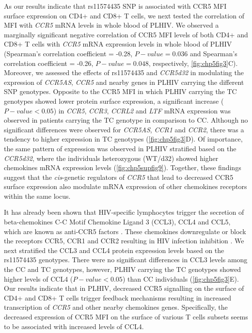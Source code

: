 \documentclass{book}
\begin{document}
\begin{refsection}
As our results indicate that rs11574435 SNP is associated with CCR5 MFI surface expression on CD4+ and CD8+ T cells, we next tested the correlation of MFI with \textit{CCR5} mRNA levels in whole blood of PLHIV.
We observed a marginally significant negative correlation of CCR5 MFI levels of both CD4+ and CD8+ T cells with \textit{CCR5} mRNA expression levels in whole blood of PLHIV (Spearman's correlation coefficient = -0.28, $P-value = 0.036$ and Spearman's correlation coefficient = -0.26, $P-value = 0.048$, respectively, \ref{fig:chp5fig3}C).
Moreover, we assessed the effects of rs11574435 and \textit{CCR5d32} in modulating the expression of \textit{CCR5AS}, \textit{CCR5} and nearby genes in PLHIV carrying the different SNP genotypes.
Opposite to the CCR5 MFI in which PLHIV carrying the TC genotypes showed lower protein surface expression, a significant increase ($P-value < 0.05$) in \textit{CCR5}, \textit{CCR3}, \textit{CCRL2} and \textit{LTF} mRNA expression was observed in patients carrying the TC genotype in comparison to CC.
Although no significant differences were observed for \textit{CCR5AS}, \textit{CCR1} and \textit{CCR2}, there was a tendency to higher expression in TC genotypes (\ref{fig:chp5fig3}D).
Of importance, the same pattern of expression was observed in PLHIV stratified based on the \textit{CCR5d32}, where the individuals heterozygous (WT/d32) showed higher chemokines mRNA expression levels (\ref{fig:chp5supfig9}).
Together, these findings suggest that the \textit{cis}-genetic regulators of \textit{CCR5} that lead to decreased CCR5 surface expression also modulate mRNA expression of other chemokines receptors within the same locus.  

It has already been shown that HIV-specific lymphocytes trigger the secretion of beta-chemokines C-C Motif Chemokine Ligand 3 (CCL3), CCL4 and CCL5, which are known as anti-CCR5 factors \cite{Abdelwahab2003HIV}.
These chemokines downregulate or block the receptors CCR5, CCR1 and CCR2 resulting in HIV infection inhibition \cite{Guan2002Natural}.
We next stratified the CCL3 and CCL4 protein expression levels based on the rs11574435 genotypes.
There were no significant differences in CCL3 levels among the CC and TC genotypes, however, PLHIV carrying the TC genotypes showed higher levels of CCL4 ($P-value < 0.05$) than CC individuals (\ref{fig:chp5fig3}E).
Our results indicate that in PLHIV, decreased CCR5 signalling on the surface of CD4+ and CD8+ T cells trigger feedback mechanisms resulting in increased transcription of \textit{CCR5} and other nearby chemokines genes.
Specifically, the decreased expression of CCR5 MFI on the surface of various T cells subsets seems to be associated with increased levels of CCL4.


\end{refsection}
\end{document}
